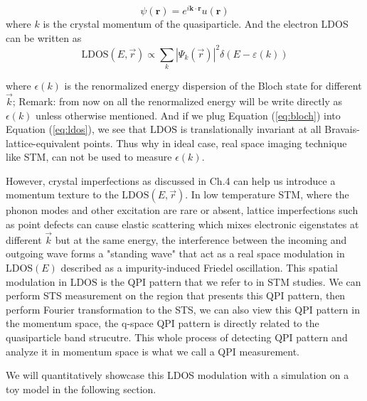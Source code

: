 \begin{equation}
\psi(\mathbf{r}) = e^{i \mathbf{k} \cdot \mathbf{r}} u(\mathbf{r})
\label{eq:bloch}
\end{equation} 
where $k$ is the crystal momentum of the quasiparticle. And the electron \ac{LDOS} can be written as  
\begin{equation}
\text{LDOS}(E, \vec{r}) \propto \sum_k |\Psi_k(\vec{r})|^2 \delta(E - \varepsilon(k))
\label{eq:ldos}
\end{equation}

where  $\epsilon(k)$ is the renormalized energy dispersion of the Bloch state for different $\vec{k}$; Remark: from now on all the renormalized energy will be write directly as $\epsilon(k)$ unless otherwise mentioned. And if we plug Equation (\ref{eq:bloch}) into Equation (\ref{eq:ldos}), we see that $\text{LDOS}$ is translationally invariant at all Bravais-lattice-equivalent points. Thus why in ideal case, real space imaging technique like \ac{STM}, can not be used to measure $\epsilon(k)$. 

However, crystal imperfections as discussed in Ch.4 can help us introduce a momentum texture to the $\text{LDOS}(E, \vec{r})$. In low temperature STM, where the phonon modes and other excitation are rare or absent, lattice imperfections such as point defects can cause elastic scattering which mixes electronic eigenstates at different $\vec{k}$ but at the same energy, the interference between the incoming and outgoing wave forms a "standing wave" that act as a real space modulation in $\text{LDOS}(E)$ described as a impurity-induced Friedel oscillation\cite{benaFriedelOscillationsDecoding2016}. This spatial modulation in $\text{LDOS}$ is the QPI pattern that we refer to in STM studies. We can perform \ac{STS} measurement on the region that presents this QPI pattern, then perform Fourier transformation to the STS, we can also view this QPI pattern in the momentum space, the q-space QPI pattern is directly related to the quasiparticle band strucutre. This whole process of detecting QPI pattern and analyze it in momentum space is what we call a QPI measurement. 

We will quantitatively showcase this \ac{LDOS} modulation with a simulation on a toy model in the following section. 


